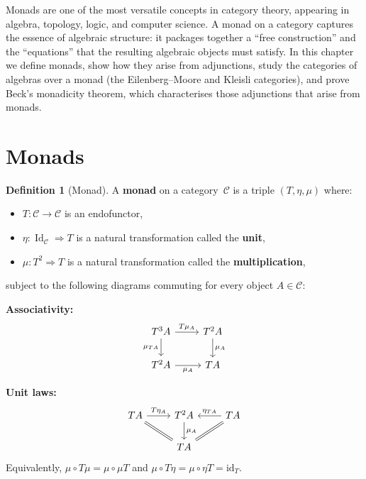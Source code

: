 \documentclass[a4paper,12pt]{book}
\DeclareMathOperator{\Id}{Id}
\newcommand{\id}{\mathrm{id}}
\theoremstyle{definition}
\newtheorem{definition}{Definition}[section]
\theoremstyle{plain}
\theoremstyle{remark}
\begin{document}
\vspace{1em}

Monads are one of the most versatile concepts in category theory,
appearing in algebra, topology, logic, and computer science.
A monad on a category captures the essence of algebraic structure:
it packages together a ``free construction'' and the ``equations''
that the resulting algebraic objects must satisfy.
In this chapter we define monads, show how they arise from adjunctions,
study the categories of algebras over a monad (the Eilenberg--Moore and
Kleisli categories), and prove Beck's monadicity theorem, which
characterises those adjunctions that arise from monads.


\section{Monads}\label{sec:monad-def}

\begin{definition}[Monad]\label{def:monad}
A \textbf{monad} on a category~$\mathcal{C}$ is a triple
$(T,\eta,\mu)$ where:
\begin{itemize}
\item $T\colon\mathcal{C}\to\mathcal{C}$ is an endofunctor,
\item $\eta\colon\Id_{\mathcal{C}}\Rightarrow T$ is a natural
    transformation called the \textbf{unit},
\item $\mu\colon T^2\Rightarrow T$ is a natural transformation called
    the \textbf{multiplication},
\end{itemize}
subject to the following diagrams commuting for every object
$A\in\mathcal{C}$:

\textbf{Associativity:}
\[
\begin{tikzcd}
T^3A \arrow[r, "T\mu_A"] \arrow[d, "\mu_{TA}"'] &
T^2A \arrow[d, "\mu_A"] \\
T^2A \arrow[r, "\mu_A"'] &
TA
\end{tikzcd}
\]

\textbf{Unit laws:}
\[
\begin{tikzcd}
TA \arrow[r, "T\eta_A"] \arrow[dr, equal] &
T^2A \arrow[d, "\mu_A"] &
TA \arrow[l, "\eta_{TA}"'] \arrow[dl, equal] \\
& TA &
\end{tikzcd}
\]
Equivalently, $\mu\circ T\mu = \mu\circ\mu T$ and
$\mu\circ T\eta = \mu\circ\eta T = \id_T$.
\end{definition}
\end{document}
